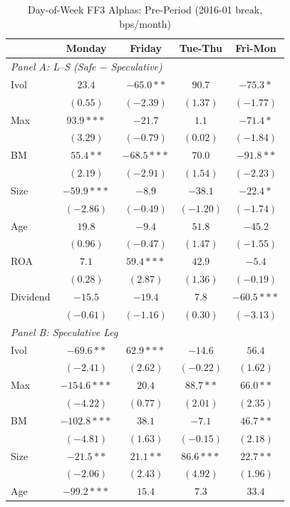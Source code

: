 \begin{table}[htbp]
\centering
\caption{Day-of-Week FF3 Alphas: Pre-Period (2016-01 break, bps/month)}
\label{tab:split_ff3_201601_pre_ff3}
\footnotesize
\begin{tabular}{l c c c c}
\toprule
 & Monday & Friday & Tue-Thu & Fri-Mon \\
\midrule
\multicolumn{5}{l}{\textit{Panel A: L--S (Safe $-$ Speculative)}} \\
Ivol & $23.4$ & $-65.0**$ & $90.7$ & $-75.3*$ \\
 & $(0.55)$ & $(-2.39)$ & $(1.37)$ & $(-1.77)$ \\
Max & $93.9***$ & $-21.7$ & $1.1$ & $-71.4*$ \\
 & $(3.29)$ & $(-0.79)$ & $(0.02)$ & $(-1.84)$ \\
BM & $55.4**$ & $-68.5***$ & $70.0$ & $-91.8**$ \\
 & $(2.19)$ & $(-2.91)$ & $(1.54)$ & $(-2.23)$ \\
Size & $-59.9***$ & $-8.9$ & $-38.1$ & $-22.4*$ \\
 & $(-2.86)$ & $(-0.49)$ & $(-1.20)$ & $(-1.74)$ \\
Age & $19.8$ & $-9.4$ & $51.8$ & $-45.2$ \\
 & $(0.96)$ & $(-0.47)$ & $(1.47)$ & $(-1.55)$ \\
ROA & $7.1$ & $59.4***$ & $42.9$ & $-5.4$ \\
 & $(0.28)$ & $(2.87)$ & $(1.36)$ & $(-0.19)$ \\
Dividend & $-15.5$ & $-19.4$ & $7.8$ & $-60.5***$ \\
 & $(-0.61)$ & $(-1.16)$ & $(0.30)$ & $(-3.13)$ \\
\midrule
\multicolumn{5}{l}{\textit{Panel B: Speculative Leg}} \\
Ivol & $-69.6**$ & $62.9***$ & $-14.6$ & $56.4$ \\
 & $(-2.41)$ & $(2.62)$ & $(-0.22)$ & $(1.62)$ \\
Max & $-154.6***$ & $20.4$ & $88.7**$ & $66.0**$ \\
 & $(-4.22)$ & $(0.77)$ & $(2.01)$ & $(2.35)$ \\
BM & $-102.8***$ & $38.1$ & $-7.1$ & $46.7**$ \\
 & $(-4.81)$ & $(1.63)$ & $(-0.15)$ & $(2.18)$ \\
Size & $-21.5**$ & $21.1**$ & $86.6***$ & $22.7**$ \\
 & $(-2.06)$ & $(2.43)$ & $(4.92)$ & $(1.96)$ \\
Age & $-99.2***$ & $15.4$ & $7.3$ & $33.4$ \\

\end{tabular}
\end{table}
